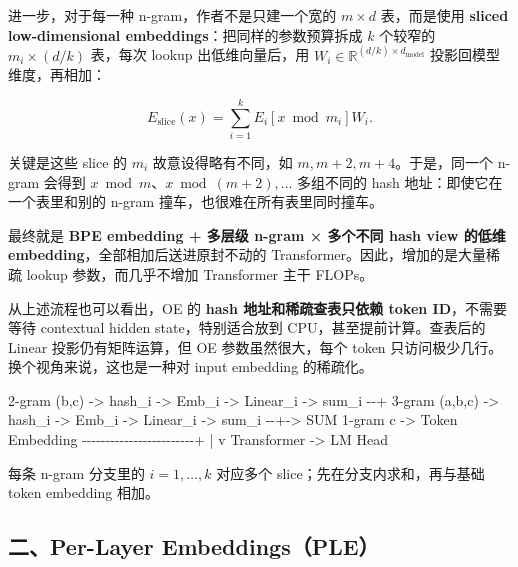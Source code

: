 \documentclass[
  11pt,
  a4paper,
  fontset=none]{ctexart}
\newenvironment{Shaded}{}{}
\newcommand{\NormalTok}[1]{#1}
\newenvironment{NotesFormula}{%
  \par\noindent\begin{minipage}{\linewidth}%
  \setlength{\parindent}{2em}%
  \setlength{\parskip}{0.35em}%
}{\end{minipage}\par}
\begin{document}
\begin{NotesFormula}

进一步，对于每一种 n-gram，作者不是只建一个宽的 \(m\times d\)
表，而是使用 \textbf{sliced low-dimensional
embeddings}：把同样的参数预算拆成 \(k\) 个较窄的 \(m_i\times(d/k)\)
表，每次 lookup 出低维向量后，用
\(W_i\in\mathbb{R}^{(d/k)\times d_{\mathrm{model}}}\)
投影回模型维度，再相加：

\[
E_{\mathrm{slice}}(x)=\sum_{i=1}^{k}E_i[x\bmod m_i]W_i.
\]

\end{NotesFormula}

关键是这些 slice 的 \(m_i\) 故意设得略有不同，如
\(m,m+2,m+4\)。于是，同一个 n-gram 会得到
\(x\bmod m\)、\(x\bmod(m+2),\ldots\) 多组不同的 hash
地址：即使它在一个表里和别的 n-gram 撞车，也很难在所有表里同时撞车。

最终就是 \textbf{BPE embedding + 多层级 n-gram × 多个不同 hash view
的低维 embedding}，全部相加后送进原封不动的
Transformer。因此，增加的是大量稀疏 lookup 参数，而几乎不增加
Transformer 主干 FLOPs。

从上述流程也可以看出，OE 的 \textbf{hash 地址和稀疏查表只依赖 token
ID}，不需要等待 contextual hidden state，特别适合放到
CPU，甚至提前计算。查表后的 Linear 投影仍有矩阵运算，但 OE
参数虽然很大，每个 token 只访问极少几行。换个视角来说，这也是一种对
input embedding 的稀疏化。

\begin{Shaded}
\begin{Highlighting}[]
\NormalTok{2{-}gram (b,c)   {-}\textgreater{} hash\_i {-}\textgreater{} Emb\_i {-}\textgreater{} Linear\_i {-}\textgreater{} sum\_i {-}{-}+}
\NormalTok{3{-}gram (a,b,c) {-}\textgreater{} hash\_i {-}\textgreater{} Emb\_i {-}\textgreater{} Linear\_i {-}\textgreater{} sum\_i {-}{-}+{-}\textgreater{} SUM}
\NormalTok{1{-}gram c      {-}\textgreater{} Token Embedding {-}{-}{-}{-}{-}{-}{-}{-}{-}{-}{-}{-}{-}{-}{-}{-}{-}{-}{-}{-}{-}{-}{-}{-}+     |}
\NormalTok{                                                              v}
\NormalTok{                                                    Transformer {-}\textgreater{} LM Head}
\end{Highlighting}
\end{Shaded}

每条 n-gram 分支里的 \(i=1,\ldots,k\) 对应多个
slice；先在分支内求和，再与基础 token embedding 相加。

\clearpage

\subsection{二、Per-Layer
Embeddings（PLE）}\label{ux4e8cper-layer-embeddingsple}
\end{document}
